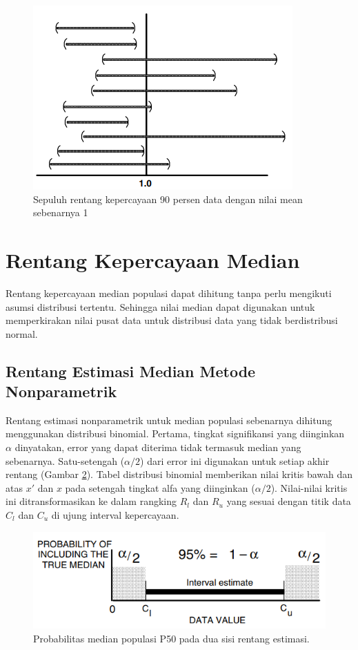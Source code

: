 \documentclass[]{book}
\begin{document}
\begin{figure}

{\centering \includegraphics[width=0.65\linewidth]{iievis2} 

}

\caption{Sepuluh rentang kepercayaan 90 persen data dengan nilai mean sebenarnya 1}\label{fig:iievis2}
\end{figure}

\section{Rentang Kepercayaan Median}\label{rentang-kepercayaan-median}

Rentang kepercayaan median populasi dapat dihitung tanpa perlu mengikuti
asumsi distribusi tertentu. Sehingga nilai median dapat digunakan untuk
memperkirakan nilai pusat data untuk distribusi data yang tidak
berdistribusi normal.

\subsection{Rentang Estimasi Median Metode
Nonparametrik}\label{rentang-estimasi-median-metode-nonparametrik}

Rentang estimasi nonparametrik untuk median populasi sebenarnya dihitung
menggunakan distribusi binomial. Pertama, tingkat signifikansi yang
diinginkan \(\alpha\) dinyatakan, error yang dapat diterima tidak
termasuk median yang sebenarnya. Satu-setengah (\(\alpha/2\)) dari error
ini digunakan untuk setiap akhir rentang (Gambar \ref{fig:iemednp}).
Tabel distribusi binomial memberikan nilai kritis bawah dan atas \(x'\)
dan \(x\) pada setengah tingkat alfa yang diinginkan (\(\alpha/2\)).
Nilai-nilai kritis ini ditransformasikan ke dalam rangking \(R_l\) dan
\(R_u\) yang sesuai dengan titik data \(C_l\) dan \(C_u\) di ujung
interval kepercayaan.

\begin{figure}

{\centering \includegraphics[width=0.65\linewidth]{iemednp} 

}

\caption{Probabilitas median populasi P50 pada dua sisi rentang estimasi.}\label{fig:iemednp}
\end{figure}
\end{document}
